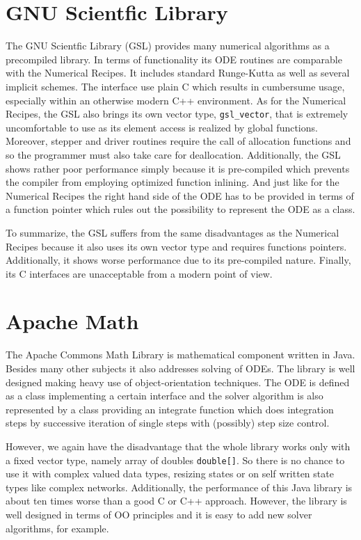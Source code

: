 \documentclass[a4paper,10pt]{article}
\begin{document}
\section{GNU Scientfic Library}
The GNU Scientfic Library (GSL) provides many numerical algorithms as a precompiled library.
In terms of functionality its ODE routines are comparable with the Numerical Recipes.
It includes standard Runge-Kutta as well as several implicit schemes.
The interface use plain C which results in cumbersume usage, especially within an otherwise modern C++ environment.
As for the Numerical Recipes, the GSL also brings its own vector type, \lstinline+gsl_vector+, that is extremely uncomfortable to use as its element access is realized by global functions.
Moreover, stepper and driver routines require the call of allocation functions and so the programmer must also take care for deallocation.
Additionally, the GSL shows rather poor performance simply because it is pre-compiled which prevents the compiler from employing optimized function inlining.
And just like for the Numerical Recipes the right hand side of the ODE has to be provided in terms of a function pointer which rules out the possibility to represent the ODE as a class.

To summarize, the GSL suffers from the same disadvantages as the Numerical Recipes because it also uses its own vector type and requires functions pointers.
Additionally, it shows worse performance due to its pre-compiled nature.
Finally, its C interfaces are unacceptable from a modern point of view.

\section{Apache Math}
The Apache Commons Math Library is mathematical component written in Java.
Besides many other subjects it also addresses solving of ODEs.
The library is well designed making heavy use of object-orientation techniques.
The ODE is defined as a class implementing a certain interface and the solver algorithm is also represented by a class providing an integrate function which does integration steps by successive iteration of single steps with (possibly) step size control.

However, we again have the disadvantage that the whole library works only with a fixed vector type, namely array of doubles \lstinline+double[]+.
So there is no chance to use it with complex valued data types, resizing states or on self written state types like complex networks.
Additionally, the performance of this Java library is about ten times worse than a good C or C++ approach.
However, the library is well designed in terms of OO principles and it is easy to add new solver algorithms, for example.
\end{document}
